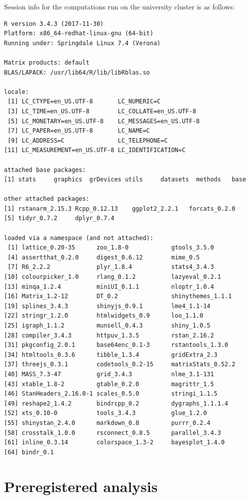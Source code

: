 \documentclass[]{article}
\theoremstyle{definition}
\theoremstyle{definition}
\theoremstyle{remark}
\begin{document}
Session info for the computations run on the university cluster is as
follows:

\begin{verbatim}
R version 3.4.3 (2017-11-30)
Platform: x86_64-redhat-linux-gnu (64-bit)
Running under: Springdale Linux 7.4 (Verona)

Matrix products: default
BLAS/LAPACK: /usr/lib64/R/lib/libRblas.so

locale:
 [1] LC_CTYPE=en_US.UTF-8       LC_NUMERIC=C
 [3] LC_TIME=en_US.UTF-8        LC_COLLATE=en_US.UTF-8
 [5] LC_MONETARY=en_US.UTF-8    LC_MESSAGES=en_US.UTF-8
 [7] LC_PAPER=en_US.UTF-8       LC_NAME=C
 [9] LC_ADDRESS=C               LC_TELEPHONE=C
[11] LC_MEASUREMENT=en_US.UTF-8 LC_IDENTIFICATION=C

attached base packages:
[1] stats     graphics  grDevices utils     datasets  methods   base

other attached packages:
[1] rstanarm_2.15.3 Rcpp_0.12.13    ggplot2_2.2.1   forcats_0.2.0
[5] tidyr_0.7.2     dplyr_0.7.4

loaded via a namespace (and not attached):
 [1] lattice_0.20-35      zoo_1.8-0            gtools_3.5.0
 [4] assertthat_0.2.0     digest_0.6.12        mime_0.5
 [7] R6_2.2.2             plyr_1.8.4           stats4_3.4.3
[10] colourpicker_1.0     rlang_0.1.2          lazyeval_0.2.1
[13] minqa_1.2.4          miniUI_0.1.1         nloptr_1.0.4
[16] Matrix_1.2-12        DT_0.2               shinythemes_1.1.1
[19] splines_3.4.3        shinyjs_0.9.1        lme4_1.1-14
[22] stringr_1.2.0        htmlwidgets_0.9      loo_1.1.0
[25] igraph_1.1.2         munsell_0.4.3        shiny_1.0.5
[28] compiler_3.4.3       httpuv_1.3.5         rstan_2.16.2
[31] pkgconfig_2.0.1      base64enc_0.1-3      rstantools_1.3.0
[34] htmltools_0.3.6      tibble_1.3.4         gridExtra_2.3
[37] threejs_0.3.1        codetools_0.2-15     matrixStats_0.52.2
[40] MASS_7.3-47          grid_3.4.3           nlme_3.1-131
[43] xtable_1.8-2         gtable_0.2.0         magrittr_1.5
[46] StanHeaders_2.16.0-1 scales_0.5.0         stringi_1.1.5
[49] reshape2_1.4.2       bindrcpp_0.2         dygraphs_1.1.1.4
[52] xts_0.10-0           tools_3.4.3          glue_1.2.0
[55] shinystan_2.4.0      markdown_0.8         purrr_0.2.4
[58] crosstalk_1.0.0      rsconnect_0.8.5      parallel_3.4.3
[61] inline_0.3.14        colorspace_1.3-2     bayesplot_1.4.0
[64] bindr_0.1
\end{verbatim}

\section{Preregistered analysis}\label{preregistered-analysis}
\end{document}
